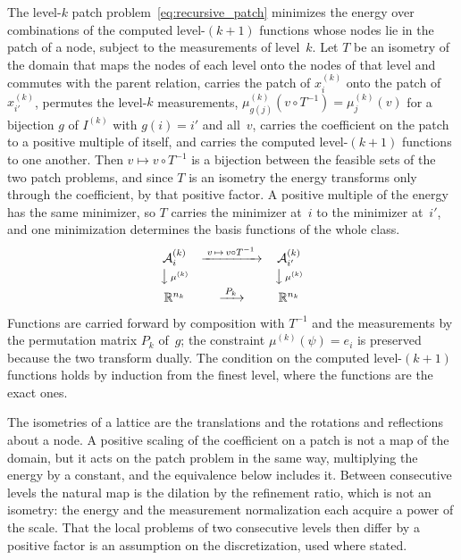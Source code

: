 \documentclass[hidelinks]{siamart}
\theoremstyle{nonumberplain}
\numberwithin{theorem}{section}
\begin{document}
The level-$k$ patch problem~\eqref{eq:recursive_patch} minimizes the
energy over combinations of the computed level-$(k{+}1)$ functions
whose nodes lie in the patch of a node, subject to the measurements of
level~$k$.  Let $T$ be an isometry of the domain that maps the nodes of
each level onto the nodes of that level and commutes with the parent
relation, carries the patch of $x^{(k)}_i$ onto the patch of
$x^{(k)}_{i'}$, permutes the level-$k$ measurements,
$\mu^{(k)}_{g(j)}(v \circ T^{-1}) = \mu^{(k)}_j(v)$ for a bijection $g$
of $I^{(k)}$ with $g(i) = i'$ and all~$v$, carries the coefficient on
the patch to a positive multiple of itself, and carries the computed
level-$(k{+}1)$ functions to one another.  Then $v \mapsto v \circ T^{-1}$
is a bijection between the feasible sets of the two patch problems, and
since $T$ is an isometry the energy transforms only through the
coefficient, by that positive factor.  A positive multiple of the energy
has the same minimizer, so $T$ carries the minimizer at~$i$ to the
minimizer at~$i'$, and one minimization determines the basis functions
of the whole class.
\[
  \begin{array}{ccc}
    \mathcal{A}^{(k)}_i & \xrightarrow{\;v \,\mapsto\, v \circ T^{-1}\;}
      & \mathcal{A}^{(k)}_{i'} \\[2pt]
    \big\downarrow\,{\scriptstyle \mu^{(k)}} & &
      \big\downarrow\,{\scriptstyle \mu^{(k)}} \\[2pt]
    \mathbb{R}^{n_k} & \xrightarrow{\;P_k\;} & \mathbb{R}^{n_k}
  \end{array}
\]
Functions are carried forward by composition with $T^{-1}$ and the
measurements by the permutation matrix $P_k$ of~$g$; the constraint
$\mu^{(k)}(\psi) = e_i$ is preserved because the two transform dually.
The condition on the computed level-$(k{+}1)$ functions holds by
induction from the finest level, where the functions are the exact ones.

The isometries of a lattice are the translations and the rotations and
reflections about a node.  A positive scaling of the coefficient on a
patch is not a map of the domain, but it acts on the patch problem in
the same way, multiplying the energy by a constant, and the equivalence
below includes it.  Between consecutive levels the natural map is the
dilation by the refinement ratio, which is not an isometry: the energy
and the measurement normalization each acquire a power of the scale.
That the local problems of two consecutive levels then differ by a
positive factor is an assumption on the discretization, used where
stated.
\end{document}
